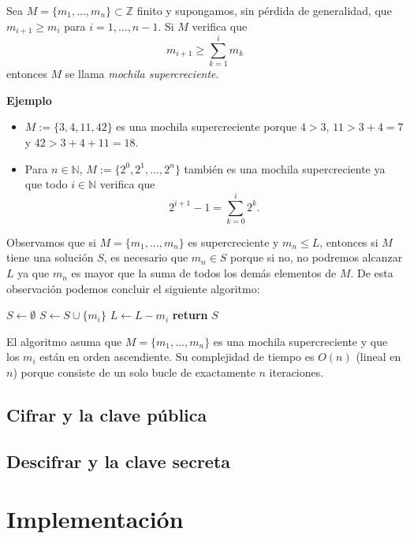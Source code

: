 \documentclass[12pt]{article}
\newcommand{\N}{\mathbb{N}}
\newcommand{\Z}{\mathbb{Z}}
\newenvironment{definition}[2][Definición]{\begin{trivlist}
\item[\hskip \labelsep {\bfseries #1}]}{\end{trivlist}}
\begin{document}
\begin{definition}{1}
Sea $M = \{m_1, ..., m_n\} \subset \Z$ finito y supongamos, sin pérdida de generalidad, que $m_{i+1} \geq m_i$ para $i = 1, ..., n-1$. Si $M$ verifica que
$$m_{i+1} \geq \sum_{k=1}^im_k$$
entonces $M$ se llama \emph{mochila supercreciente}.
\end{definition}
\textbf{Ejemplo}
\begin{itemize}
\item
$M := \{3, 4, 11, 42\}$ es una mochila supercreciente porque $4 > 3$, $11 > 3 + 4 = 7$ y $42 > 3 + 4 + 11 = 18$.

\item 
Para $n \in \N$, $M := \{2^0, 2^1, ..., 2^n\}$ también es una mochila supercreciente ya que todo $i \in \N$ verifica que
$$2^{i+1} - 1 = \sum_{k=0}^i2^k.$$
\end{itemize}
Observamos que si $M = \{m_1, ..., m_n\}$ es supercreciente y $m_n \leq L$, entonces si $M$ tiene una solución $S$, es necesario que $m_n \in S$ porque si no, no podremos alcanzar $L$ ya que $m_n$ es mayor que la suma de todos los demás elementos de $M$.
De esta observación podemos concluir el siguiente algoritmo:
\vspace{1em}
\begin{algorithmic}[1]
\State $S \gets \emptyset$
		\State $S \gets S \cup \{m_i\}$
		\State $L \gets L - m_i$
	\EndIf
\EndFor
\State \textbf{return} $S$
\EndProcedure
\end{algorithmic}
\vspace{1em}
El algoritmo asuma que $M = \{m_1,...,m_n\}$ es una mochila supercreciente y que los $m_i$ están en orden ascendiente. Su complejidad de tiempo es $O(n)$ (lineal en $n$) porque consiste de un solo bucle de exactamente $n$ iteraciones.

\subsection*{Cifrar y la clave pública}

\subsection*{Descifrar y la clave secreta}

\section{Implementación}
\end{document}
